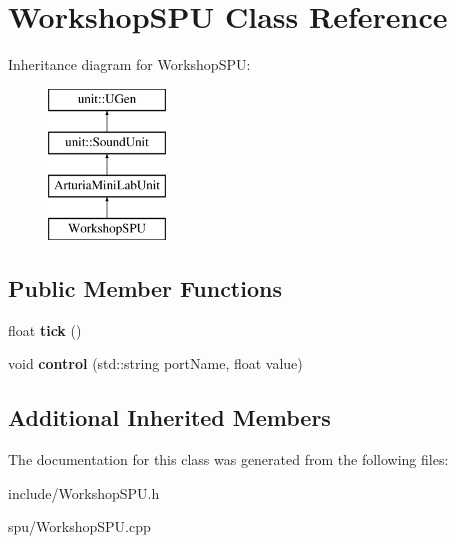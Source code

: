 \hypertarget{classWorkshopSPU}{\section{Workshop\-S\-P\-U Class Reference}
\label{classWorkshopSPU}
}
Inheritance diagram for Workshop\-S\-P\-U\-:\begin{figure}[H]
\begin{center}
\leavevmode
\includegraphics[height=4.000000cm]{classWorkshopSPU}
\end{center}
\end{figure}
\subsection*{Public Member Functions}
\begin{DoxyCompactItemize}
\item 
\hypertarget{classWorkshopSPU_a8721f1f7429f4b7f3ced46fc781674b7}{float {\bfseries tick} ()}\label{classWorkshopSPU_a8721f1f7429f4b7f3ced46fc781674b7}

\item 
\hypertarget{classWorkshopSPU_a72adc07c2054fd0cdfe623da30bb23ba}{void {\bfseries control} (std\-::string port\-Name, float value)}\label{classWorkshopSPU_a72adc07c2054fd0cdfe623da30bb23ba}

\end{DoxyCompactItemize}
\subsection*{Additional Inherited Members}


The documentation for this class was generated from the following files\-:\begin{DoxyCompactItemize}
\item 
include/Workshop\-S\-P\-U.\-h\item 
spu/Workshop\-S\-P\-U.\-cpp\end{DoxyCompactItemize}
